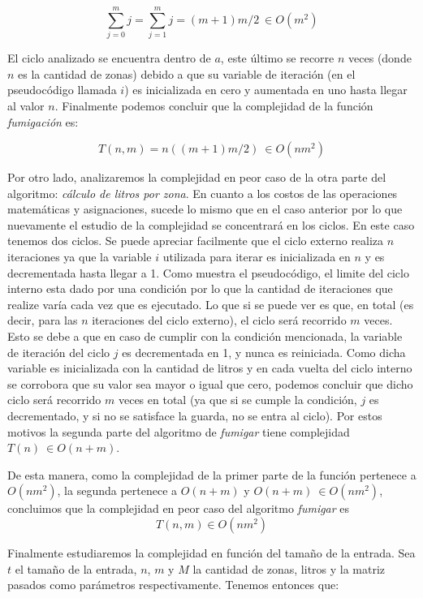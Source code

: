 \documentclass[a4paper,11pt] {article}
\begin{document}
$$\sum_{j=0}^{m}j=\sum_{j=1}^{m}j=(m+1)m/2\ \in O(m^{2})  $$

El ciclo analizado se encuentra dentro de $a$, este \'ultimo se recorre $n$ veces (donde $n$ es la cantidad de zonas) debido a que su variable de iteraci\'on (en el pseudoc\'odigo llamada $i$) es inicializada en cero y aumentada en uno hasta llegar al valor $n$. Finalmente podemos concluir que la complejidad de la funci\'on \textit{fumigaci\'on} es:

$$T(n,m)=n((m+1)m/2)\ \in O(nm^{2})$$


Por otro lado, analizaremos la complejidad en peor caso de la otra parte del algoritmo: \textit{c\'alculo de litros por zona}. En cuanto a los costos de las operaciones matem\'aticas y asignaciones, sucede lo mismo que en el caso anterior por lo que nuevamente el estudio de la complejidad se concentrar\'a en los ciclos. En este caso tenemos dos ciclos. Se puede apreciar facilmente que el ciclo externo realiza $n$ iteraciones ya que la variable $i$ utilizada para iterar es inicializada en $n$ y es decrementada hasta llegar a 1. Como muestra el pseudoc\'odigo, el limite del ciclo interno esta dado por una condici\'on por lo que la cantidad de iteraciones que realize var\'ia cada vez que es ejecutado. Lo que si se puede ver es que, en total (es decir, para las $n$ iteraciones del ciclo externo), el ciclo ser\'a recorrido $m$ veces. Esto se debe a que en caso de cumplir con la condici\'on mencionada, la variable de iteraci\'on del ciclo $j$ es decrementada en 1, y nunca es reiniciada. Como dicha variable es inicializada con la cantidad de litros y en cada vuelta del ciclo interno se corrobora que su valor sea mayor o igual que cero, podemos concluir que dicho ciclo ser\'a recorrido $m$ veces en total (ya que si se cumple la condici\'on, $j$ es decrementado, y si no se satisface la guarda, no se entra al ciclo). Por estos motivos la segunda parte del algoritmo de \textit{fumigar} tiene complejidad $T(n)\ \in O(n+m)$.


De esta manera, como la complejidad de la primer parte de la funci\'on pertenece a $O(nm^{2})$, la segunda pertenece a $O(n+m)$ y $O(n+m)\ \in O(nm^{2})$, concluimos que la complejidad en peor caso del algoritmo \textit{fumigar} es $$T(n,m) \in O(nm^{2})$$


Finalmente estudiaremos la complejidad en funci\'on del tama\~{n}o de la entrada. Sea $t$ el tama\~{n}o de la entrada, $n$, $m$ y $M$ la cantidad de zonas, litros y la matriz pasados como par\'ametros respectivamente. Tenemos entonces que:
\end{document}
